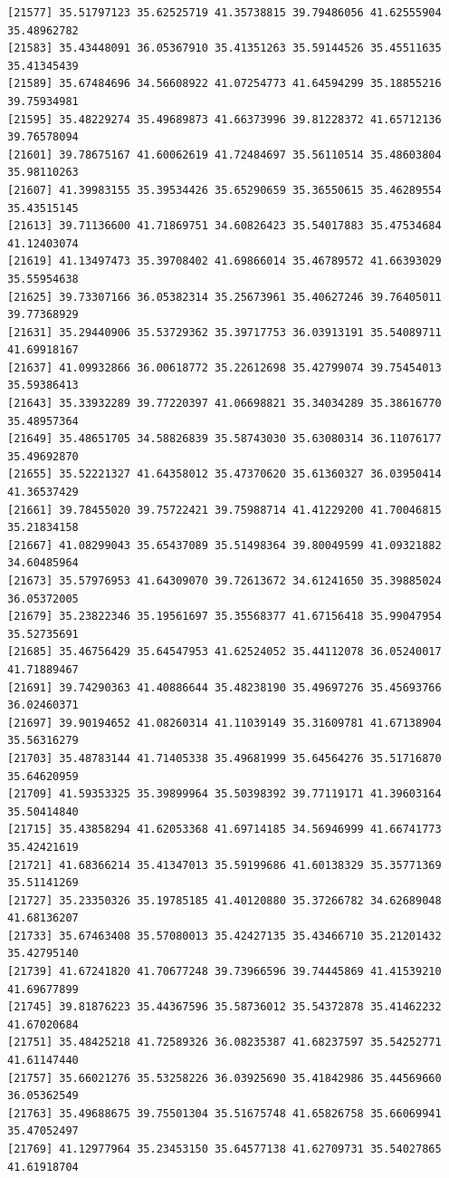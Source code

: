 \documentclass[
  letterpaper,
  DIV=11,
  numbers=noendperiod]{scrartcl}
\begin{document}
\begin{verbatim}
[21577] 35.51797123 35.62525719 41.35738815 39.79486056 41.62555904 35.48962782
[21583] 35.43448091 36.05367910 35.41351263 35.59144526 35.45511635 35.41345439
[21589] 35.67484696 34.56608922 41.07254773 41.64594299 35.18855216 39.75934981
[21595] 35.48229274 35.49689873 41.66373996 39.81228372 41.65712136 39.76578094
[21601] 39.78675167 41.60062619 41.72484697 35.56110514 35.48603804 35.98110263
[21607] 41.39983155 35.39534426 35.65290659 35.36550615 35.46289554 35.43515145
[21613] 39.71136600 41.71869751 34.60826423 35.54017883 35.47534684 41.12403074
[21619] 41.13497473 35.39708402 41.69866014 35.46789572 41.66393029 35.55954638
[21625] 39.73307166 36.05382314 35.25673961 35.40627246 39.76405011 39.77368929
[21631] 35.29440906 35.53729362 35.39717753 36.03913191 35.54089711 41.69918167
[21637] 41.09932866 36.00618772 35.22612698 35.42799074 39.75454013 35.59386413
[21643] 35.33932289 39.77220397 41.06698821 35.34034289 35.38616770 35.48957364
[21649] 35.48651705 34.58826839 35.58743030 35.63080314 36.11076177 35.49692870
[21655] 35.52221327 41.64358012 35.47370620 35.61360327 36.03950414 41.36537429
[21661] 39.78455020 39.75722421 39.75988714 41.41229200 41.70046815 35.21834158
[21667] 41.08299043 35.65437089 35.51498364 39.80049599 41.09321882 34.60485964
[21673] 35.57976953 41.64309070 39.72613672 34.61241650 35.39885024 36.05372005
[21679] 35.23822346 35.19561697 35.35568377 41.67156418 35.99047954 35.52735691
[21685] 35.46756429 35.64547953 41.62524052 35.44112078 36.05240017 41.71889467
[21691] 39.74290363 41.40886644 35.48238190 35.49697276 35.45693766 36.02460371
[21697] 39.90194652 41.08260314 41.11039149 35.31609781 41.67138904 35.56316279
[21703] 35.48783144 41.71405338 35.49681999 35.64564276 35.51716870 35.64620959
[21709] 41.59353325 35.39899964 35.50398392 39.77119171 41.39603164 35.50414840
[21715] 35.43858294 41.62053368 41.69714185 34.56946999 41.66741773 35.42421619
[21721] 41.68366214 35.41347013 35.59199686 41.60138329 35.35771369 35.51141269
[21727] 35.23350326 35.19785185 41.40120880 35.37266782 34.62689048 41.68136207
[21733] 35.67463408 35.57080013 35.42427135 35.43466710 35.21201432 35.42795140
[21739] 41.67241820 41.70677248 39.73966596 39.74445869 41.41539210 41.69677899
[21745] 39.81876223 35.44367596 35.58736012 35.54372878 35.41462232 41.67020684
[21751] 35.48425218 41.72589326 36.08235387 41.68237597 35.54252771 41.61147440
[21757] 35.66021276 35.53258226 36.03925690 35.41842986 35.44569660 36.05362549
[21763] 35.49688675 39.75501304 35.51675748 41.65826758 35.66069941 35.47052497
[21769] 41.12977964 35.23453150 35.64577138 41.62709731 35.54027865 41.61918704

\end{verbatim}
\end{document}
